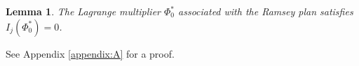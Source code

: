 \documentclass[12pt]{article}
\newtheorem{lemma}[theorem]{Lemma}
\newcommand{\NW}[1]{{\textcolor{blue}{#1}}}
\begin{document}
\begin{lemma} \label{lemma1}
The Lagrange multiplier $\Phi_0^\ast$ associated with the Ramsey plan satisfies  $I_j(\Phi_0^\ast)=0$. 
\end{lemma} 
See Appendix \ref{appendix:A} for a proof.



%
%
\end{document}
